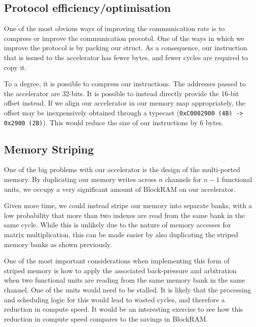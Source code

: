 \documentclass[a4paper,8pt]{report}
\begin{document}
\subsection{Protocol efficiency/optimisation}
One of the most obvious ways of improving the communication rate is to compress
or improve the communication procotol. One of the ways in which we improve the
protocol is by packing our struct. As a consequence, our instruction that is
issued to the accelerator has fewer bytes, and fewer cycles are required to copy it.

To a degree, it is possible to compress our instructions. The addresses passed
to the accelerator are 32-bits. It is possible to instead directly provide the
16-bit offset instead. If we align our accelerator in our memory map
appropriately, the offset may be inexpensively obtained through a typecast
(\texttt{0xC0002900 (4B) -> 0x2900 (2B)}). This would reduce the size of our
instructions by 6 bytes.



\subsection{Memory Striping}
One of the big problems with our accelerator is the design of the multi-ported
memory. By duplicating our memory writes across $n$ channels for $n-1$
functional units, we occupy a very significant amount of BlockRAM on our
accelerator.

Given more time, we could instead stripe our memory into separate banks, with a
low probability that more than two indexes are read from the same bank in the
same cycle. While this is unlikely due to the nature of memory accesses for matrix
multiplication, this can be made easier by also duplicating the striped memory
banks as shown previously.

One of the most important considerations when implementing this form of striped
memory is how to apply the associated back-pressure and arbitration when two functional units
are reading from the same memory bank in the same channel. One of the units
would need to be stalled. It is likely that the processing and scheduling logic
for this would lead to wasted cycles, and therefore a reduction in compute
speed. It would be an interesting exercise to see how this reduction in compute
speed compares to the savings in BlockRAM.
\end{document}
